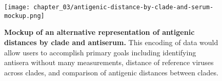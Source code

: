 \begin{figure}
  \centering
  \texttt{[image: chapter\_03/antigenic-distance-by-clade-and-serum-mockup.png]}
  \caption[{Mockup of an alternative representation of antigenic distances by clade and antiserum.}]{\label{fig:mockup-of-antigenic-distance-by-clade} {\bf Mockup of an alternative representation of antigenic distances by clade and antiserum.}
  This encoding of data would allow users to accomplish primary goals including identifying antisera without many measurements, distance of reference viruses across clades, and comparison of antigenic distances between clades.}
\end{figure}
